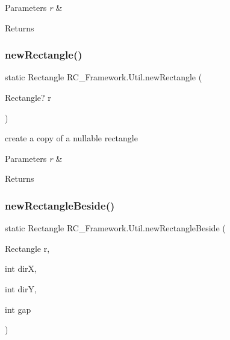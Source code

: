 \begin{DoxyParams}{Parameters}
{\em r} & \\
\hline
\end{DoxyParams}
\begin{DoxyReturn}{Returns}

\end{DoxyReturn}
\mbox{\label{class_r_c___framework_1_1_util_ad3ac7d622266e8e09e88b50b50052578}} 
\subsubsection{\texorpdfstring{new\+Rectangle()}{newRectangle()}\hspace{0.1cm}{\footnotesize\ttfamily [2/2]}}
{\footnotesize\ttfamily static Rectangle R\+C\+\_\+\+Framework.\+Util.\+new\+Rectangle (\begin{DoxyParamCaption}\item[{Rectangle?}]{r }\end{DoxyParamCaption})\hspace{0.3cm}{\ttfamily [static]}}



create a copy of a nullable rectangle 


\begin{DoxyParams}{Parameters}
{\em r} & \\
\hline
\end{DoxyParams}
\begin{DoxyReturn}{Returns}

\end{DoxyReturn}
\mbox{\label{class_r_c___framework_1_1_util_a205f56f4b98e21666462ddce5143a2e5}} 
\subsubsection{\texorpdfstring{new\+Rectangle\+Beside()}{newRectangleBeside()}}
{\footnotesize\ttfamily static Rectangle R\+C\+\_\+\+Framework.\+Util.\+new\+Rectangle\+Beside (\begin{DoxyParamCaption}\item[{Rectangle}]{r,  }\item[{int}]{dirX,  }\item[{int}]{dirY,  }\item[{int}]{gap }\end{DoxyParamCaption})\hspace{0.3cm}{\ttfamily [static]}}



